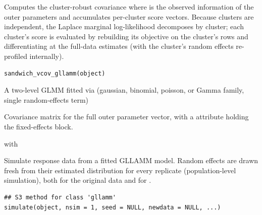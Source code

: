 \documentclass[a4paper]{book}
\begin{document}
%
\begin{Description}
Computes the cluster-robust covariance  where
 is the observed information of the outer parameters and
 accumulates per-cluster score vectors. Because
clusters are independent, the Laplace marginal log-likelihood decomposes
by cluster; each cluster's score is evaluated by rebuilding its objective
on the cluster's rows and differentiating at the full-data estimates
(with the cluster's random effects re-profiled internally).
\end{Description}
%
\begin{Usage}
\begin{verbatim}
sandwich_vcov_gllamm(object)
\end{verbatim}
\end{Usage}
%
\begin{Arguments}
\begin{ldescription}
\item[\code{object}] A two-level GLMM fitted via  (gaussian,
binomial, poisson, or Gamma family, single random-effects term)
\end{ldescription}
\end{Arguments}
%
\begin{Value}
Covariance matrix for the full outer parameter vector, with a
 attribute holding the fixed-effects block.
\end{Value}
%
\begin{SeeAlso}
 with 
\end{SeeAlso}
%
\begin{Description}
Simulate response data from a fitted GLLAMM model. Random effects are
drawn fresh from their estimated distribution for every replicate
(population-level simulation), both for the original data and for
.
\end{Description}
%
\begin{Usage}
\begin{verbatim}
## S3 method for class 'gllamm'
simulate(object, nsim = 1, seed = NULL, newdata = NULL, ...)
\end{verbatim}
\end{Usage}
%
\end{document}
